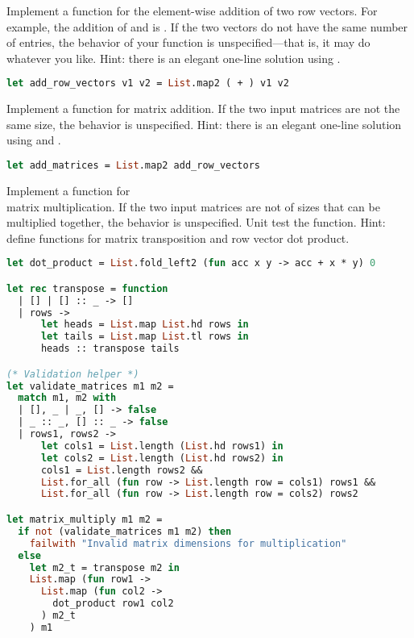 Implement a function  for the element-wise addition of two row vectors. For example, the addition of \code{[1; 1; 1]} and \code{[9; 8; 7]} is \code{[10; 9; 8]}. If the two vectors do not have the same number of entries, the behavior of your function is unspecified---that is, it may do whatever you like. Hint: there is an elegant one-line solution using .

\begin{lstlisting}[language=OCaml]
let add_row_vectors v1 v2 = List.map2 ( + ) v1 v2
\end{lstlisting}

Implement a function  for matrix addition. If the two input matrices are not the same size, the behavior is unspecified. Hint: there is an elegant one-line solution using  and .

\begin{lstlisting}[language=OCaml]
let add_matrices = List.map2 add_row_vectors
\end{lstlisting}

Implement a function  for \\ matrix multiplication. If the two input matrices are not of sizes that can be multiplied together, the behavior is unspecified. Unit test the function. Hint: define functions for matrix transposition and row vector dot product.

\begin{lstlisting}[language=OCaml]
let dot_product = List.fold_left2 (fun acc x y -> acc + x * y) 0

let rec transpose = function
  | [] | [] :: _ -> []
  | rows ->
      let heads = List.map List.hd rows in
      let tails = List.map List.tl rows in
      heads :: transpose tails

(* Validation helper *)
let validate_matrices m1 m2 =
  match m1, m2 with
  | [], _ | _, [] -> false
  | _ :: _, [] :: _ -> false
  | rows1, rows2 ->
      let cols1 = List.length (List.hd rows1) in
      let cols2 = List.length (List.hd rows2) in
      cols1 = List.length rows2 &&
      List.for_all (fun row -> List.length row = cols1) rows1 &&
      List.for_all (fun row -> List.length row = cols2) rows2

let matrix_multiply m1 m2 =
  if not (validate_matrices m1 m2) then
    failwith "Invalid matrix dimensions for multiplication"
  else
    let m2_t = transpose m2 in
    List.map (fun row1 ->
      List.map (fun col2 ->
        dot_product row1 col2
      ) m2_t
    ) m1
\end{lstlisting}